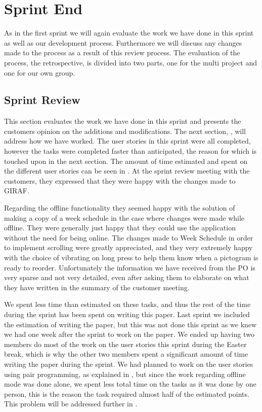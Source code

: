 \chapter{Sprint End}
As in the first sprint we will again evaluate the work we have done in this sprint as well as our development process.
Furthermore we will discuss any changes made to the process as a result of this review process.
The evaluation of the process, the retrospective, is divided into two parts, one for the multi project and one for our own group.

\section{Sprint Review}
This section evaluates the work we have done in this sprint and presents the customers opinion on the additions and modifications.
The next section, , will address how we have worked.
The user stories in this sprint were all completed, however the tasks were completed faster than anticipated, the reason for which is touched upon in the next section.
The amount of time estimated and spent on the different user stories can be seen in . 
At the sprint review meeting with the customers, they expressed that they were happy with the changes made to GIRAF. 

Regarding the offline functionality they seemed happy with the solution of making a copy of a week schedule in the case where changes were made while offline. 
They were generally just happy that they could use the application without the need for being online.
The changes made to Week Schedule in order to implement scrolling were greatly appreciated, and they very extremely happy with the choice of vibrating on long press to help them know when a pictogram is ready to reorder. 
Unfortunately the information we have received from the PO is very sparse and not very detailed, even after asking them to elaborate on what they have written in the summary of the customer meeting. 

We spent less time than estimated on these tasks, and thus the rest of the time during the sprint has been spent on writing this paper.
Last sprint we included the estimation of writing the paper, but this was not done this sprint as we knew we had one week after the sprint to work on the paper.
We ended up having two members do most of the work on the user stories this sprint during the Easter break, which is why the other two members spent a significant amount of time writing the paper during the sprint.
We had planned to work on the user stories using pair programming, as explained in , but since the work regarding offline mode was done alone, we spent less total time on the tasks as it was done by one person, this is the reason the task required almost half of the estimated points. 
This problem will be addressed further in .


